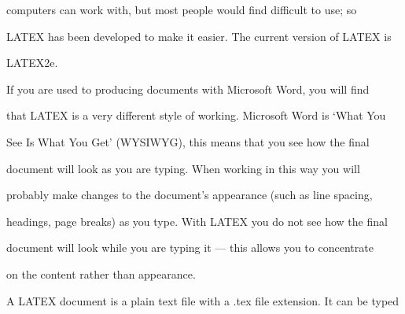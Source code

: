 \documentclass[a4paper,portrait,12pt]{article}
\begin{document}
\begin{flushleft}
computers can work with, but most people would find difficult to use; so
\end{flushleft}


\begin{flushleft}
LATEX has been developed to make it easier. The current version of LATEX is
\end{flushleft}


\begin{flushleft}
LATEX2e.
\end{flushleft}


\begin{flushleft}
If you are used to producing documents with Microsoft Word, you will find
\end{flushleft}


\begin{flushleft}
that LATEX is a very different style of working. Microsoft Word is {`}What You
\end{flushleft}


\begin{flushleft}
See Is What You Get' (WYSIWYG), this means that you see how the final
\end{flushleft}


\begin{flushleft}
document will look as you are typing. When working in this way you will
\end{flushleft}


\begin{flushleft}
probably make changes to the document's appearance (such as line spacing,
\end{flushleft}


\begin{flushleft}
headings, page breaks) as you type. With LATEX you do not see how the final
\end{flushleft}


\begin{flushleft}
document will look while you are typing it --- this allows you to concentrate
\end{flushleft}


\begin{flushleft}
on the content rather than appearance.
\end{flushleft}


\begin{flushleft}
A LATEX document is a plain text file with a .tex file extension. It can be typed
\end{flushleft}
\end{document}
